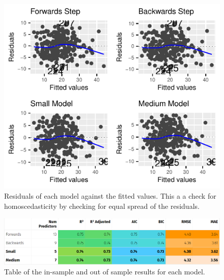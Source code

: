 \documentclass[letterpaper,9pt,twocolumn,twoside,]{pinp}
\begin{document}
\begin{figure}

{\centering \includegraphics{template_report_files/figure-latex/assump-homo-1} 

}

\caption{\label{homo:assum} Residuals of each model against the fitted values. This a a check for homoscedasticity by checking for equal spread of the residuals.}\label{fig:assump-homo}
\end{figure}

\graphicspath{ {./} }
\begin{figure}
    \caption{\label{results} Table of the in-sample and out of sample results for each model.}
    \includegraphics[scale=0.3]{results.png}
\end{figure}





\end{document}
